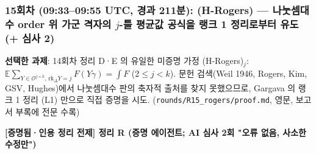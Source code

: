 \hypertarget{uxd68cuxcc28-09330955-utc-uxacbduxacfc-211uxbd84-h-rogers-uxb098uxb217uxc148uxb300uxc218-order-uxc704-uxac00uxad70-uxaca9uxc790uxc758-j-uxd2c0-uxd3c9uxade0uxac12-uxacf5uxc2dduxc744-uxb7aduxd06c-1-uxc815uxb9acuxb85cuxbd80uxd130-uxc720uxb3c4-uxc2ecuxc0ac-2}{%
\subsubsection*{\texorpdfstring{15회차 (09:33--09:55 UTC, 경과 211분): (H-Rogers) --- 나눗셈대수 order 위 가군 격자의 \(j\)-틀 평균값 공식을 랭크 1 정리로부터 유도 (+ 심사 2)}{15회차 (09:33--09:55 UTC, 경과 211분): (H-Rogers) --- 나눗셈대수 order 위 가군 격자의 j-틀 평균값 공식을 랭크 1 정리로부터 유도 (+ 심사 2)}}\label{uxd68cuxcc28-09330955-utc-uxacbduxacfc-211uxbd84-h-rogers-uxb098uxb217uxc148uxb300uxc218-order-uxc704-uxac00uxad70-uxaca9uxc790uxc758-j-uxd2c0-uxd3c9uxade0uxac12-uxacf5uxc2dduxc744-uxb7aduxd06c-1-uxc815uxb9acuxb85cuxbd80uxd130-uxc720uxb3c4-uxc2ecuxc0ac-2}}

\textbf{선택한 과제}: 14회차 정리 D·E 의 유일한 미증명 가정 (H-Rogers)\(_j\): \(\mathbb E\sum_{Y\in\mathcal O^{j\times k},\,\mathrm{rk}_\Delta Y=j}F(Y\gamma)=\int F\) (\(2\le j<k\)). 문헌 검색(Weil 1946, Rogers, Kim, GSV, Hughes)에서 나눗셈대수 판의 축자적 출처를 찾지 못했으므로, Gargava 의 랭크 1 정리 (L1) 만으로 직접 증명을 시도. (\texttt{rounds/R15\_rogers/proof.md}, 영문, 보고서 부록에 전문 수록)

\textbf{{[}증명됨·인용 정리 전제{]} 정리 R (증명 에이전트; AI 심사 2회 "오류 없음, 사소한 수정만")}

